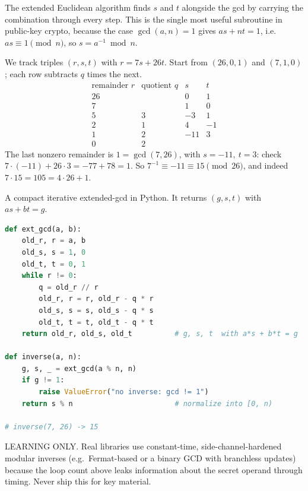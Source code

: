 The extended Euclidean algorithm finds $s$ and $t$ alongside the gcd by carrying the combination
through every step. This is the single most useful subroutine in public-key crypto, because the
case $\gcd(a,n)=1$ gives $as + nt = 1$, i.e.\ $as \equiv 1 \pmod n$, so $s = a^{-1} \bmod n$.

\begin{example}
\label{ch40:ex-extended}
We track triples $(r,s,t)$ with $r = 7s + 26t$. Start from $(26,0,1)$ and $(7,1,0)$; each row
subtracts $q$ times the next.
\[
\begin{array}{c|c|c|c}
\text{remainder } r & \text{quotient } q & s & t\\\hline
26 &   & 0 & 1\\
7  &   & 1 & 0\\
5  & 3 & -3 & 1\\
2  & 1 & 4 & -1\\
1  & 2 & -11 & 3\\
0  & 2 &  &
\end{array}
\]
The last nonzero remainder is $1 = \gcd(7,26)$, with $s=-11,\ t=3$: check $7\cdot(-11) + 26\cdot 3
= -77 + 78 = 1$. So $7^{-1} \equiv -11 \equiv 15 \pmod{26}$, and indeed $7\cdot 15 = 105 = 4\cdot 26
+ 1$.
\end{example}

\begin{implementbox}
A compact iterative extended-gcd in Python. It returns $(g,s,t)$ with $as+bt=g$.
\begin{lstlisting}[language=Python]
def ext_gcd(a, b):
    old_r, r = a, b
    old_s, s = 1, 0
    old_t, t = 0, 1
    while r != 0:
        q = old_r // r
        old_r, r = r, old_r - q * r
        old_s, s = s, old_s - q * s
        old_t, t = t, old_t - q * t
    return old_r, old_s, old_t          # g, s, t  with a*s + b*t = g

def inverse(a, n):
    g, s, _ = ext_gcd(a % n, n)
    if g != 1:
        raise ValueError("no inverse: gcd != 1")
    return s % n                        # normalize into [0, n)

# inverse(7, 26) -> 15
\end{lstlisting}
LEARNING ONLY. Real libraries use constant-time, side-channel-hardened modular inverses (e.g.\
Fermat-based or a binary GCD with branchless updates) because the loop count above leaks
information about the secret operand through timing. Never ship this for key material.
\end{implementbox}

